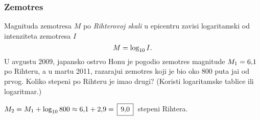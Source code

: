 \subsubsection{Zem{\lj}otres}

\zadatak Magnituda zem{\lj}otresa $M$ po {\sl Rihterovoj skali\/} u epicentru zavisi logaritamski od 
inten\-zi\-te\-ta zem{\lj}otresa $I$ 
$$
M=\log_{10} I.
$$
U avgustu 2009, japansko ostrvo Hon{\sv}u 
je pogodio zem{\lj}otres magnitude $M_1=6\.1$ po Rihteru, a u martu 2011,
razaraju{\cc}i zem{\lj}otres koji je bio oko 800 puta ja{\cv}i od prvog. Koliko stepeni po Rihteru je imao drugi?
(Koristi logaritamske tablice ili logaritmar.)

\resenje $M_2 = M_1 + \logten 800\approx 6\.1 + 2\.9 = \ram{9\.0}$ stepeni Rihtera. 
